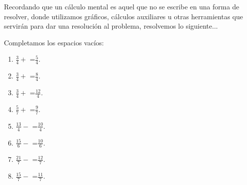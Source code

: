 \documentclass[12pt]{examdesign}
\theoremstyle{plain}
\theoremstyle{definition}
\theoremstyle{remark}
\begin{document}
	
	
	\begin{fillin}[title={Completamos los espacios vacíos:}, resetcounter=no]
		
		Recordando que un cálculo mental es aquel que no se escribe en una forma de resolver, donde utilizamos gráficos,
		cálculos auxiliares u otras herramientas que servirán para dar una resolución al problema, resolvemos lo siguiente...
		\begin{question}
			Completamos los espacios vacíos:
			\begin{enumerate}
				\item $\frac{3}{4}+$  =$\frac{5}{4}$.
				\item $\frac{3}{4}+$  =$\frac{8}{4}$.
				\item $\frac{3}{4}+$  =$\frac{12}{4}$.
				\item $\frac{5}{7}+$  =$\frac{9}{7}$.
				\item $\frac{13}{4}-$  =$\frac{10}{4}$.
				\item $\frac{15}{6}-$  =$\frac{10}{6}$.
				\item $\frac{21}{7}-$  =$\frac{12}{7}$.
				\item $\frac{15}{7}-$  =$\frac{11}{7}$.
			\end{enumerate}
        \end{question}
        

\end{fillin}
\end{document}
